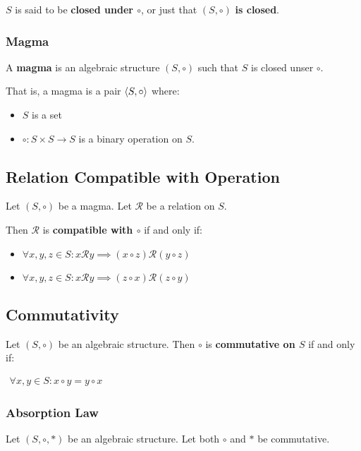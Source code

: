 $S$ is said to be \textbf{closed under $\circ$}, or just that
$(S, \circ)$ \textbf{is closed}.

\subsubsection{Magma}

A \textbf{magma} is an algebraic structure $(S, \circ)$ such that $S$
is closed unser $\circ$.

That is, a magma is a pair $\langle S, \circ \rangle$ where:

\begin{itemize}
\item $S$ is a set
\item $\circ: S \times S \to S $ is a binary operation on $S$.
\end{itemize}


\subsection{Relation Compatible with Operation}

Let $(S, \circ)$ be a magma. Let $\mathcal{R}$ be a relation on $S$.

Then $\mathcal{R}$ is \textbf{compatible with $\circ$} if and only if:

\begin{itemize}
\item $\forall x, y, z \in S: x \mathcal{R} y \implies (x \circ z) \mathcal{R} (y \circ z)$
\item $\forall x, y, z \in S: x \mathcal{R} y \implies (z \circ x) \mathcal{R} (z \circ y)$
\end{itemize}


\subsection{Commutativity}

Let $(S, \circ)$ be an algebraic structure. Then $\circ$ is
\textbf{commutative on $S$} if and only if:

\begin{math}
  \begin{array}{c}
    \forall x, y \in S: x \circ y = y \circ x
  \end{array}
\end{math}

\subsubsection{Absorption Law}
Let $(S, \circ, *)$ be an algebraic structure. Let both $\circ$ and
$*$ be commutative.

